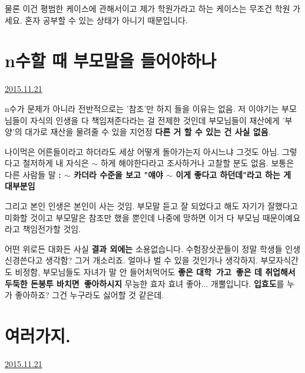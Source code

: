 물론 이건 평범한 케이스에 관해서이고
제가 학원가라고 하는 케이스는 무조건 학원 가세요.
혼자 공부할 수 있는 상태가 아니기 때문입니다.
\vspace{5mm}






\section{n수할 때 부모말을 들어야하나}
\href{https://www.kockoc.com/Apoc/503343}{2015.11.21}

\vspace{5mm}

n수가 문제가 아니라 전반적으로는 '참조'만 하지 들을 이유는 없음.
저 이야기는 부모님들이 자식의 인생을 다 책임져준다라는 걸 전제한 것인데
부모님들이 재산에게 '부양'의 대가로 재산을 물려줄 수 있을 지언정 \textbf{다른 거 할 수 있는 건 사실 없음}.
\vspace{5mm}

나이먹은 어른들이라고 하더라도 세상 어떻게 돌아가는지 아시느냐 그것도 아님.
그렇다고 철저하게 내 자식은 $\sim$ 하게 해야한다라고 조사하거나 고찰할 분도 없음.
보통은 다른 사람들 말 \textbf{: $\sim$ 카더라 수준을 보고 "얘야 $\sim$ 이게 좋다고 하던데"라고 하는 게 대부분임}
\vspace{5mm}

그리고 본인 인생은 본인이 사는 것임.
부모말 듣고 잘 되었다고 해도 자기가 잘했다고 미화할 것이고
부모말은 참조만 했을 뿐인데 나중에 망하면 이거 다 부모님 때문이예요라고 책임전가할 것임.
\vspace{5mm}

어떤 위로든 대화든 사실 \textbf{결과 외에는} 소용없습니다.
수험장삿꾼들이 정말 학생들 인생 신경쓴다고 생각함? 그거 개소리죠. 얼마나 벌 수 있을 것인가나 생각하지.
부모자식간도 비정함, 부모님들도 자녀가 말 안 들어처먹어도 \textbf{좋은 대학 가고 좋은 데 취업해서 두둑한 돈봉투 바치면 좋아하시지}
무능한 효자 효녀 좋아... 개뿔입니다. \textbf{입효도}를 누가 좋아하죠? 그건 누구라도 싫어할 것 같은데.
\vspace{5mm}






\section{여러가지.}
\href{https://www.kockoc.com/Apoc/504237}{2015.11.21}

\vspace{5mm}


